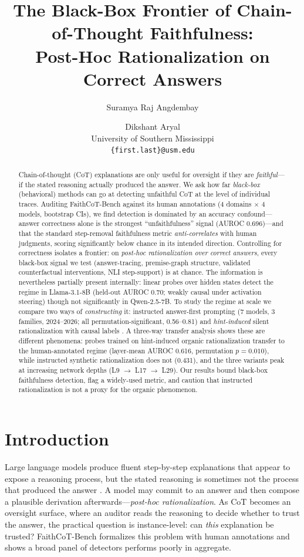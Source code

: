\documentclass[11pt]{article}
\title{The Black-Box Frontier of Chain-of-Thought Faithfulness:\\Post-Hoc Rationalization on Correct Answers}
\author{Suramya Raj Angdembay \and Dikshant Aryal \\
  University of Southern Mississippi \\
  \texttt{\{first.last\}@usm.edu}}
\begin{document}
\maketitle

\begin{abstract}
Chain-of-thought (CoT) explanations are only useful for oversight if they are \emph{faithful}---if the stated reasoning actually produced the answer. We ask how far \emph{black-box} (behavioral) methods can go at detecting unfaithful CoT at the level of individual traces. Auditing FaithCoT-Bench against its human annotations (4 domains $\times$ 4 models, bootstrap CIs), we find detection is dominated by an accuracy confound---answer correctness alone is the strongest ``unfaithfulness'' signal (AUROC 0.696)---and that the standard step-removal faithfulness metric \emph{anti-correlates} with human judgments, scoring significantly below chance in its intended direction. Controlling for correctness isolates a frontier: on \emph{post-hoc rationalization over correct answers}, every black-box signal we test (answer-tracing, premise-graph structure, validated counterfactual interventions, NLI step-support) is at chance. The information is nevertheless partially present internally: linear probes over hidden states detect the regime in Llama-3.1-8B (held-out AUROC 0.70; weakly causal under activation steering) though not significantly in Qwen-2.5-7B. To study the regime at scale we compare two ways of \emph{constructing} it: instructed answer-first prompting (7 models, 3 families, 2024--2026; all permutation-significant, 0.56--0.81) and \emph{hint-induced} silent rationalization with causal labels \citep{turpin2023language}. A three-way transfer analysis shows these are different phenomena: probes trained on hint-induced organic rationalization transfer to the human-annotated regime (layer-mean AUROC 0.616, permutation $p{=}0.010$), while instructed synthetic rationalization does not (0.431), and the three variants peak at increasing network depths (L9 $\to$ L17 $\to$ L29). Our results bound black-box faithfulness detection, flag a widely-used metric, and caution that instructed rationalization is not a proxy for the organic phenomenon.
\end{abstract}

\section{Introduction}

Large language models produce fluent step-by-step explanations that appear to expose a reasoning process, but the stated reasoning is sometimes not the process that produced the answer \citep{lanham2023measuring,turpin2023language,chen2025reasoning}. A model may commit to an answer and then compose a plausible derivation afterwards---\emph{post-hoc rationalization}. As CoT becomes an oversight surface, where an auditor reads the reasoning to decide whether to trust the answer, the practical question is instance-level: can \emph{this} explanation be trusted? FaithCoT-Bench \citep{shen2026faithcot} formalizes this problem with human annotations and shows a broad panel of detectors performs poorly in aggregate.
\end{document}

